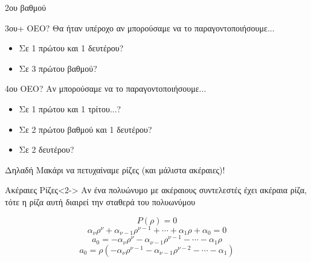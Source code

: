 \documentclass[greek]{beamer}
\begin{document}
\begin{frame}{2ου βαθμού}
  \centering
\end{frame}

\begin{frame}{3ου+ ΟΕΟ?}
  Θα ήταν υπέροχο αν μπορούσαμε να το παραγοντοποιήσουμε...
  \begin{itemize}
    \item<1-> Σε 1 πρώτου και 1 δευτέρου?
    \item<2-> Σε 3 πρώτου βαθμού?
  \end{itemize}
\end{frame}

\begin{frame}{4ου ΟΕΟ?}
  Αν μπορούσαμε να το παραγοντοποιήσουμε...
  \begin{itemize}
    \item<1-> Σε 1 πρώτου και 1 τρίτου...?
    \item<2-> Σε 2 πρώτου βαθμού και 1 δευτέρου?
    \item<3-> Σε 2 δευτέρου?
  \end{itemize}
\end{frame}

\begin{frame}{Δηλαδή}
  Μακάρι να πετυχαίναμε ρίζες (και μάλιστα ακέραιες)!
  \begin{block}{Ακέραιες Ρίζες}<2->
    Αν ένα πολυώνυμο με ακέραιους συντελεστές έχει ακέραια ρίζα, τότε η ρίζα αυτή διαιρεί την σταθερά του πολυωνύμου
  \end{block}
  {$$P(ρ)=0$$ $$α_νρ^ν+α_{ν-1}ρ^{ν-1}+\cdots+α_1ρ+α_0=0$$ $$a_0=-α_νρ^ν-α_{ν-1}ρ^{ν-1}-\cdots-α_1ρ $$ $$a_0=ρ(-α_νρ^{ν-1}-α_{ν-1}ρ^{ν-2}-\cdots-α_1)$$}

\end{frame}
\end{document}
